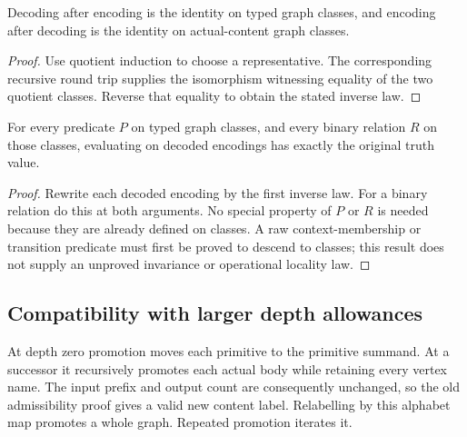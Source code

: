 





\begin{theorem}
Decoding after encoding is the identity on typed graph classes, and encoding
after decoding is the identity on actual-content graph classes.
\end{theorem}
\begin{proof}
Use quotient induction to choose a representative. The corresponding recursive
round trip supplies the isomorphism witnessing equality of the two quotient
classes. Reverse that equality to obtain the stated inverse law.
\end{proof}


\begin{lemma}
For every predicate $P$ on typed graph classes, and every binary relation $R$
on those classes, evaluating on decoded encodings has exactly the original
truth value.
\end{lemma}
\begin{proof}
Rewrite each decoded encoding by the first inverse law. For a binary relation
do this at both arguments. No special property of $P$ or $R$ is needed because
they are already defined on classes. A raw context-membership or transition
predicate must first be proved to descend to classes; this result does not
supply an unproved invariance or operational locality law.
\end{proof}


\subsection{Compatibility with larger depth allowances}
\begin{definition}
At depth zero promotion moves each primitive to the primitive summand. At a
successor it recursively promotes each actual body while retaining every
vertex name. The input prefix and output count are consequently unchanged,
so the old admissibility proof gives a valid new content label. Relabelling
by this alphabet map promotes a whole graph. Repeated promotion iterates it.
\end{definition}

